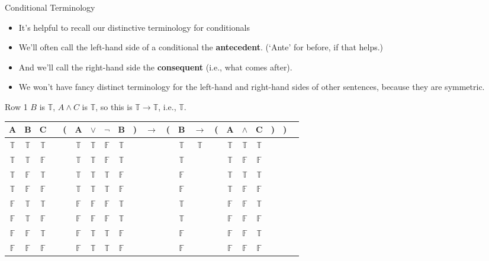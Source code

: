 \documentclass[
  ignorenonframetext,
]{beamer}
\providecommand{\tightlist}{%
  \setlength{\itemsep}{0pt}\setlength{\parskip}{0pt}}
\renewcommand{\,}{\text{, }}
\def\True{\mathbb{T}}
\def\False{\mathbb{F}}
\begin{document}
\begin{frame}{Conditional Terminology}
\protect\hypertarget{conditional-terminology}{}
\begin{itemize}
\tightlist
\item
  It's helpful to recall our distinctive terminology for conditionals
\item
  We'll often call the left-hand side of a conditional the
  \textbf{antecedent}. (`Ante' for before, if that helps.) \pause
\item
  And we'll call the right-hand side the \textbf{consequent} (i.e., what
  comes after).
\item
  We won't have fancy distinct terminology for the left-hand and
  right-hand sides of other sentences, because they are symmetric.
\end{itemize}
\end{frame}

\begin{frame}{Row 1}
\protect\hypertarget{row-1}{}
\(B\) is \(\True\), \(A \wedge C\) is \(\True\), so this is
\(\True \rightarrow \True\), i.e., \(\True\).

\begin{center}

\begin{tabular}{@{ }c@{ }@{ }c@{ }@{ }c | c@{ }@{}c@{}@{ }c@{ }@{ }c@{ }@{ }c@{ }@{ }c@{ }@{}c@{}@{ }c@{ }@{}c@{}@{ }c@{ }@{ }c@{ }@{}c@{}@{ }c@{ }@{ }c@{ }@{ }c@{ }@{}c@{}@{}c@{}@{ }c}
A & B & C &  & ( & A & $\vee$ & $\neg$ & B & ) & $\rightarrow$ & ( & B & $\rightarrow$ & ( & A & $\wedge$ & C & ) & ) & \\
\hline 
 $\True$ & $\True$ & $\True$ &  &  & $\True$ & $\True$ & $\False$ & $\True$ &  &&  & $\True$ & $\True$ &  & $\True$ & $\True$ & $\True$ &  &  & \\
 $\True$ & $\True$ & $\False$ &  &  & $\True$ & $\True$ & $\False$ & $\True$ &  &&  & $\True$ &&  & $\True$ & $\False$ & $\False$ &  &  & \\
 $\True$ & $\False$ & $\True$ &  &  & $\True$ & $\True$ & $\True$ & $\False$ &  &&  & $\False$ &&  & $\True$ & $\True$ & $\True$ &  &  & \\
 $\True$ & $\False$ & $\False$ &  &  & $\True$ & $\True$ & $\True$ & $\False$ &  &&  & $\False$ &&  & $\True$ & $\False$ & $\False$ &  &  & \\
 $\False$ & $\True$ & $\True$ &  &  & $\False$ & $\False$ & $\False$ & $\True$ &  &&  & $\True$ &&  & $\False$ & $\False$ & $\True$ &  &  & \\
 $\False$ & $\True$ & $\False$ &  &  & $\False$ & $\False$ & $\False$ & $\True$ &  &&  & $\True$ &&  & $\False$ & $\False$ & $\False$ &  &  & \\
 $\False$ & $\False$ & $\True$ &  &  & $\False$ & $\True$ & $\True$ & $\False$ &  &&  & $\False$ &&  & $\False$ & $\False$ & $\True$ &  &  & \\
 $\False$ & $\False$ & $\False$ &  &  & $\False$ & $\True$ & $\True$ & $\False$ &  &&  & $\False$ &&  & $\False$ & $\False$ & $\False$ &  &  & \\
\end{tabular}

\end{center}
\end{frame}
\end{document}
